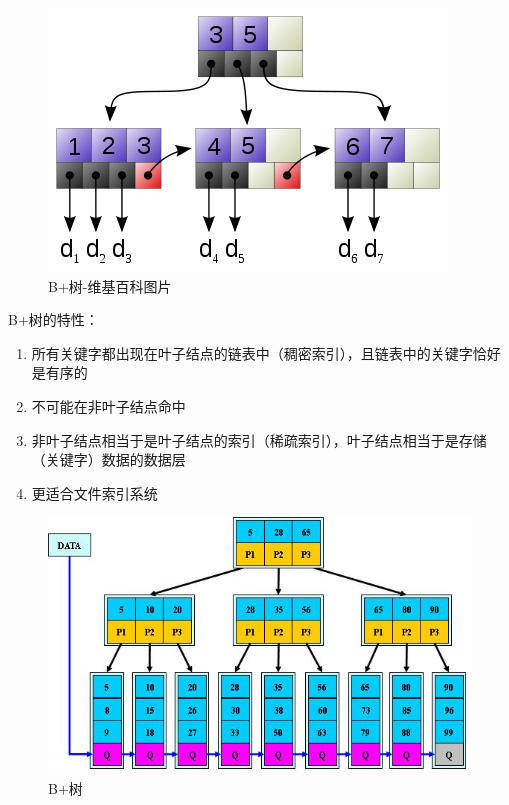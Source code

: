 \begin{figure}[ht]
	\begin{center}
		\includegraphics[keepaspectratio,width=0.6\paperwidth]{Pictures/BTree/BplusTree-wiki.png}
	\caption{B+树-维基百科图片}
	\label{fig:BplusTree-wiki}
	\end{center}
\end{figure}

B+树的特性：
\begin{enumerate}
  \item 所有关键字都出现在叶子结点的链表中（稠密索引），且链表中的关键字恰好是有序的
  \item 不可能在非叶子结点命中
  \item 非叶子结点相当于是叶子结点的索引（稀疏索引），叶子结点相当于是存储（关键字）数据的数据层
  \item 更适合文件索引系统
\end{enumerate}

\begin{figure}[ht]
	\begin{center}
		\includegraphics[keepaspectratio,width=0.6\paperwidth]{Pictures/BTree/BPlusTree.jpg}
	\caption{B+树}
	\label{fig:BplusTree}
	\end{center}
\end{figure}

